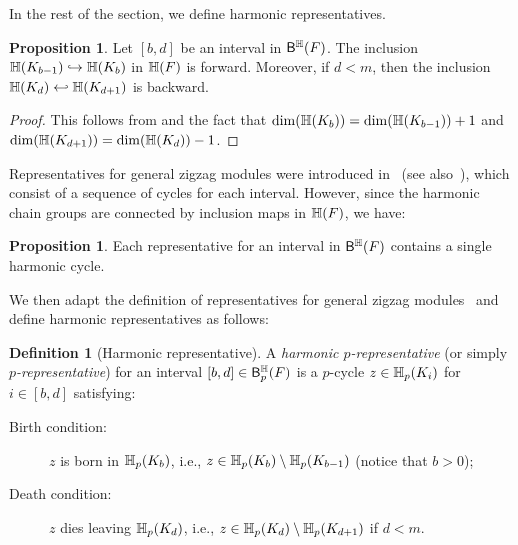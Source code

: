 \documentclass[10pt,a4paper]{amsart}
\newcommand {\mm}[1] {\ifmmode{#1}\else{\mbox{\(#1\)}}\fi}
\newcommand{\har}           {\mm{\mathbb{H}}}
\newcommand{\para}[1]{\vspace{2mm}\noindent{\textbf{\sffamily{#1}}}\hspace{4pt}}
\theoremstyle{definition}
\newcommand{\Tao}[1]{{\color{magenta}[#1]}}
\newcommand{\red}{\color{red}}
\newcommand{\filt}{F}
\newcommand{\filtcnt}{m}
\newcommand{\incto}{\hookrightarrow}
\newcommand{\bakincto}{\hookleftarrow}
\newcommand{\hbarc}{\mathsf{B}^\har}
\newtheorem{definition}[theorem]{Definition}
\newtheorem{proposition}[theorem]{Proposition}
\theoremstyle{remark}
\begin{document}
\para{Harmonic Representatives.}
In the rest of the section, we define harmonic representatives.
\begin{proposition}
Let $[b,d]$ be an interval in $\hbarc(\filt)$.
The inclusion $\har(K_{b-1}) \incto \har(K_b)$ in $\har(\filt)$
is forward.
Moreover, if $d<\filtcnt$,
then the inclusion $\har(K_{d}) \bakincto \har(K_{d+1})$ is backward.
\end{proposition}
\begin{proof}
This follows from  and the fact that 
$\dim(\har(K_{b}))=\dim(\har(K_{b-1}))+1$ 
and
$\dim(\har(K_{d+1}))=\dim(\har(K_{d}))-1$.
\end{proof}

Representatives for general zigzag modules were introduced in~\cite{BendichPaul2013Haro,maria2015zigzag} (see also~\cite{zzrep}),
which consist of a sequence of cycles
for each interval.
However, since the harmonic chain groups are connected by inclusion maps in $\har(\filt)$,
we have:
\begin{proposition}\label{prop:single-rep}
Each representative for an interval in $\hbarc(\filt)$
contains a single harmonic cycle.
\end{proposition}

We then adapt the definition of representatives for
general zigzag modules~\cite{zzrep,maria2015zigzag} and 
define
harmonic representatives as follows:
\begin{definition}[Harmonic representative]\label{dfn:rep}
A \emph{harmonic $p$-representative}
{\rm(}or simply \emph{$p$-representative}{\rm)}
for an interval $[b,d]\in\hbarc_p(\filt)$ is a $p$-cycle 
$z\in\har_p(K_i)$ for $i\in[b,d]$ satisfying:
\begin{description}
\item[Birth condition:] $z$ is born in $\har_p(K_{b})$, i.e., $z\in\har_p(K_{b})\setminus\har_p(K_{b-1})$ {\rm(}notice that $b>0${\rm);}
\item[Death condition:] $z$ dies leaving $\har_p(K_{d})$, i.e., $z\in\har_p(K_{d})\setminus\har_p(K_{d+1})$ if $d<m$.
\end{description}
\end{definition}
\end{document}
